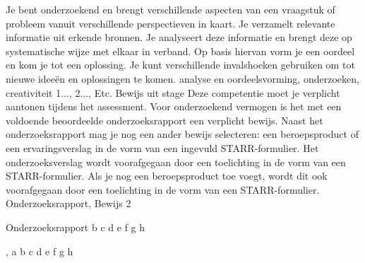 
\competentie
{%
	\competentieformulier
	{%
		Je bent onderzoekend en brengt verschillende aspecten van een vraagstuk of probleem vanuit verschillende perspectieven in kaart. Je verzamelt relevante informatie uit erkende bronnen. Je analyseert deze informatie en brengt deze op systematische wijze met elkaar in verband. Op basis hiervan vorm je een oordeel en kom je tot een oplossing. Je kunt verschillende invalshoeken gebruiken om tot nieuwe ideeën en oplossingen te komen.
	}
	{%
		analyse en oordeelsvorming,%
		onderzoeken,%
		creativiteit%
	}
	{%
		1...,%
		2...,%
		Etc.%
	}
	{%
		Bewijs uit stage
	}
	{%
		Deze competentie moet je verplicht aantonen tijdens het assessment. Voor onderzoekend vermogen is het met een voldoende beoordeelde onderzoeksrapport een verplicht bewijs. Naast het onderzoeksrapport mag je nog een ander bewijs selecteren: een beroepsproduct of een ervaringsverslag in de vorm van een ingevuld STARR-formulier. Het onderzoeksverslag wordt voorafgegaan door een toelichting in de vorm van een STARR-formulier. Als je nog een beroepsproduct toe voegt, wordt dit ook voorafgegaan door een toelichting in de vorm van een STARR-formulier.
	}
	{%
		Onderzoeksrapport,%
		Bewijs 2%
	}
}
{%
	\bewijs
	{%
		Onderzoeksrapport
	}
	{%
		\starr
		{%
			b
		}
		{%
			c
		}
		{%
			d
		}
		{%
			e
		}
		{%
			f
		}
		{%
			g
		}
		{%
			h
		}
	}
	{%
		{%
			
			
			
		}
	},
	\bewijs
	{%
		a
	}
	{%
		\starr
		{%
			b
		}
		{%
			c
		}
		{%
			d
		}
		{%
			e
		}
		{%
			f
		}
		{%
			g
		}
		{%
			h
		}
	}
	{%
		
	}
}
